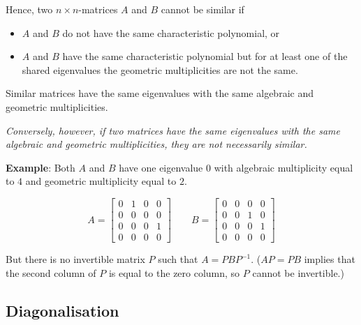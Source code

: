 \begin{paracol}{2}
Hence, two $n \times n$-matrices $A$ and $B$ cannot be similar if

\begin{itemize}
    \item $A$ and $B$ do not have the same characteristic polynomial, or
    \item $A$ and $B$ have the same characteristic polynomial but for at least one of the shared eigenvalues the geometric multiplicities are not the same.
\end{itemize}

Similar matrices have the same eigenvalues with the same algebraic and geometric multiplicities.

\textit{Conversely, however, if two matrices have the same eigenvalues with the same algebraic and geometric multiplicities, they are not necessarily similar.}

\textbf{Example}: Both $A$ and $B$ have one eigenvalue $0$ with algebraic multiplicity equal to $4$ and geometric multiplicity equal to $2$.

$$A = \begin{bmatrix}
    0 & 1 & 0 & 0 \\
    0 & 0 & 0 & 0 \\
    0 & 0 & 0 & 1 \\
    0 & 0 & 0 & 0
\end{bmatrix} \qquad B = \begin{bmatrix}
    0 & 0 & 0 & 0 \\
    0 & 0 & 1 & 0 \\
    0 & 0 & 0 & 1 \\
    0 & 0 & 0 & 0
\end{bmatrix}$$

But there is no invertible matrix $P$ such that $A = PBP^{-1}$. ($AP = PB$ implies that the second column of $P$ is equal to the zero column, so $P$ cannot be invertible.)

\end{paracol}

\newpage

\subsection{Diagonalisation}

